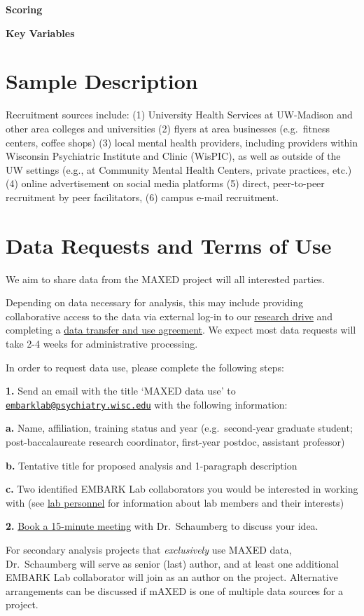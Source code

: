 \documentclass[
]{book}
\begin{document}
\textbf{Scoring}

\textbf{Key Variables}

\hypertarget{sample-description}{%
\chapter{Sample Description}\label{sample-description}}

Recruitment sources include: (1) University Health Services at UW-Madison and other area colleges and universities (2) flyers at area businesses (e.g.~fitness centers, coffee shops) (3) local mental health providers, including providers within Wisconsin Psychiatric Institute and Clinic (WisPIC), as well as outside of the UW settings (e.g., at Community Mental Health Centers, private practices, etc.) (4) online advertisement on social media platforms (5) direct, peer-to-peer recruitment by peer facilitators, (6) campus e-mail recruitment.

\hypertarget{data-requests-and-terms-of-use}{%
\chapter{Data Requests and Terms of Use}\label{data-requests-and-terms-of-use}}

We aim to share data from the MAXED project will all interested parties.

Depending on data necessary for analysis, this may include providing collaborative access to the data via external log-in to our \href{https://kb.wisc.edu/researchdata/page.php?id=96642}{research drive} and completing a \href{https://rsp.wisc.edu/contracts/DTUA-De-IdentifiedData.pdf}{data transfer and use agreement}. We expect most data requests will take 2-4 weeks for administrative processing.

In order to request data use, please complete the following steps:

\textbf{1.} Send an email with the title `MAXED data use' to \href{mailto:embarklab@psychiatry.wisc.edu}{\nolinkurl{embarklab@psychiatry.wisc.edu}} with the following information:

\textbf{a.} Name, affiliation, training status and year (e.g.~second-year graduate student; post-baccalaureate research coordinator, first-year postdoc, assistant professor)

\textbf{b.} Tentative title for proposed analysis and 1-paragraph description

\textbf{c.} Two identified EMBARK Lab collaborators you would be interested in working with (see \href{https://embark.psychiatry.wisc.edu/index.php/people/}{lab personnel} for information about lab members and their interests)

\textbf{2.} \href{https://calendly.com/katherine-schaumberg/15min}{Book a 15-minute meeting} with Dr.~Schaumberg to discuss your idea.

For secondary analysis projects that \emph{exclusively} use MAXED data, Dr.~Schaumberg will serve as senior (last) author, and at least one additional EMBARK Lab collaborator will join as an author on the project. Alternative arrangements can be discussed if mAXED is one of multiple data sources for a project.

  
\end{document}
